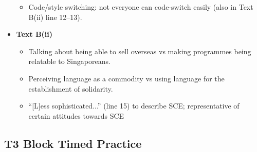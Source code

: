 \documentclass[../main.tex]{subfiles}
\begin{document}
\begin{itemize}
\begin{itemize}
                \item Code/style switching: not everyone can code-switch easily (also in Text B(ii) line 12--13).
            \end{itemize}
            \item \textbf{Text B(ii)} \begin{itemize}
                \item Talking about being able to sell overseas vs making programmes being relatable to Singaporeans.
                \item Perceiving language as a commodity vs using language for the establishment of solidarity.
                \item ``[L]ess sophisticated...'' (line 15) to describe SCE; representative of certain attitudes towards SCE
            \end{itemize}
        \end{itemize}
		
		\subsection*{T3 Block Timed Practice}
\end{document}
